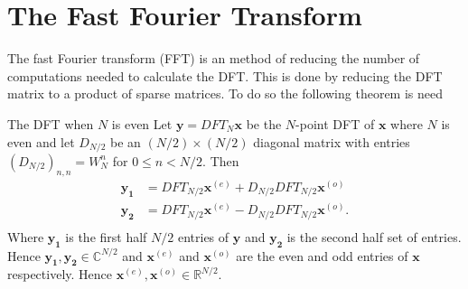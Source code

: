 \section{The Fast Fourier Transform}
The fast Fourier transform (FFT) is an method of reducing the number of computations needed to calculate the DFT. This is done by reducing the DFT matrix to a product of sparse matrices. 
To do so the following theorem is need
\begin{theorem}{The DFT when $N$ is even}
    Let $\mathbf{y}=DFT_{N}\mathbf{x}$ be the $N$-point DFT of $\mathbf{x}$ where $N$ is even and let $D_{N/2}$ be an $(N/2)\times(N/2)$ diagonal matrix with entries $(D_{N/2})_{n,n}=W_N^n$ for $0\leq n< N/2$. Then
    \begin{align*}
         \mathbf{y_1}&=DFT_{N/2}\mathbf{x}^{(e)}+D_{N/2}DFT_{N/2}\mathbf{x}^{(o)}\\ 
         \mathbf{y_2}&=DFT_{N/2}\mathbf{x}^{(e)}-D_{N/2}DFT_{N/2}\mathbf{x}^{(o)}.\\
    \end{align*}
    Where $\mathbf{y_1}$ is the first half $N/2$ entries of $\mathbf{y}$ and $\mathbf{y_2}$ is the second half set of entries. Hence $\mathbf{y_1},\mathbf{y_2}\in \mathds{C}^{N/2}$ and $\mathbf{x}^{(e)}$ and $\mathbf{x}^{(o)}$ are the even and odd entries of $\mathbf{x}$ respectively. Hence $\mathbf{x}^{(e)},\mathbf{x}^{(o)}\in \mathds{R}^{N/2}$.
\end{theorem}
